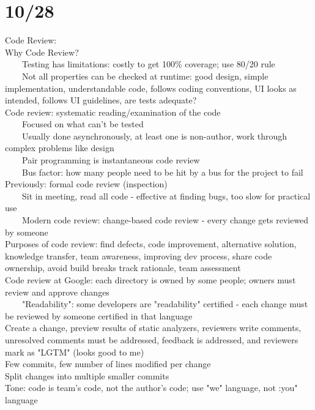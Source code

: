 \documentclass[10pt,letterpaper,unboxed,cm]{article}
\newcommand{\tab}{~~~~}
\begin{document}
\section{10/28}
Code Review: \\
Why Code Review?\\
\tab Testing has limitations: costly to get 100\% coverage; use 80/20 rule\\
\tab Not all properties can be checked at runtime: good design, simple implementation, understandable code, follows coding conventions, UI looks as intended, follows UI guidelines, are tests adequate?\\
Code review: systematic reading/examination of the code\\
\tab Focused on what can't be tested\\
\tab Usually done asynchronously, at least one is non-author, work through complex problems like design\\
\tab Pair programming is instantaneous code review\\
\tab Bus factor: how many people need to be hit by a bus for the project to fail\\
Previously: formal code review (inspection)\\
\tab Sit in meeting, read all code - effective at finding bugs, too slow for practical use\\
\tab Modern code review: change-based code review - every change gets reviewed by someone\\
Purposes of code review: find defects, code improvement, alternative solution, knowledge transfer, team awareness, improving dev process, share code ownership, avoid build breaks track rationale, team assessment\\
Code review at Google: each directory is owned by some people; owners must review and approve changes\\
\tab "Readability": some developers are "readability" certified - each change must be reviewed by someone certified in that language\\
Create a change, preview results of static analyzers, reviewers write comments, unresolved comments must be addressed, feedback is addressed, and reviewers mark as "LGTM" (looks good to me)\\
Few commits, few number of lines modified per change\\
Split changes into multiple smaller commits\\
Tone: code is team's code, not the author's code; use "we" language, not :you" language\\
\end{document}
